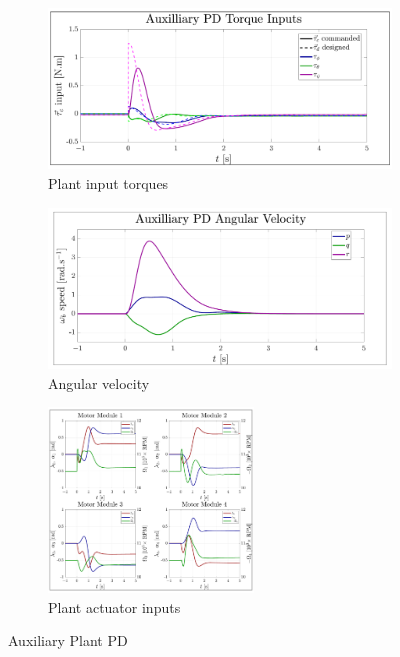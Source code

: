 \begin{figure}[htbp]\ContinuedFloat
\begin{subfigure}{0.49\textwidth}
\centering
\includegraphics[width=\textwidth]{graphs/XPD_Torque}
\vspace{-20pt}
\caption{Plant input torques}
\label{fig:XPD_Torque}
\end{subfigure}
\begin{subfigure}{0.49\textwidth}
\centering
\includegraphics[width=\textwidth]{graphs/XPD_Angular}
\vspace{-20pt}
\caption{Angular velocity}
\label{fig:XPD_Angular}
\end{subfigure}
\begin{subfigure}{\textwidth}
\centering
\includegraphics[width=0.6\textwidth]{graphs/XPD_Input}
\vspace{-6pt}
\caption{Plant actuator inputs}
\label{fig:XPD_Input}
\end{subfigure}
\vspace{-8pt}
\caption{Auxiliary Plant PD}
\end{figure}

